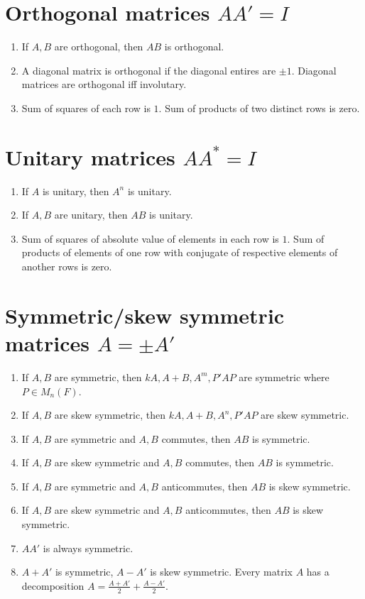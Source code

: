 \section{Orthogonal matrices $AA'=I$}
\begin{enumerate}
	\item If $A,B$ are orthogonal, then $AB$ is orthogonal.
	\item A diagonal matrix is orthogonal if the diagonal entires are $\pm 1$.
		\subitem Diagonal matrices are orthogonal iff involutary.
	\item Sum of squares of each row is $1$. Sum of products of two distinct rows is zero.
\end{enumerate}

\section{Unitary matrices $AA^\ast=I$}
\begin{enumerate}
	\item If $A$ is unitary, then $A^n$ is unitary.
	\item If $A,B$ are unitary, then $AB$ is unitary.
	\item Sum of squares of absolute value of elements in each row is $1$. Sum of products of elements of one row with conjugate of respective elements of another rows is zero.
\end{enumerate}

\section{Symmetric/skew symmetric matrices $A=\pm A'$}
\begin{enumerate}
	\item If $A,B$ are symmetric, then $kA,A+B,A^m,P'AP$ are symmetric where $P \in M_n(F)$.
	\item If $A,B$ are skew symmetric, then $kA,A+B,A^n,P'AP$ are skew symmetric.
	\item If $A,B$ are symmetric and $A,B$ commutes, then $AB$ is symmetric.
	\item If $A,B$ are skew symmetric and $A,B$ commutes, then $AB$ is symmetric.
	\item If $A,B$ are symmetric and $A,B$ anticommutes, then $AB$ is skew symmetric.
	\item If $A,B$ are skew symmetric and $A,B$ anticommutes, then $AB$ is skew symmetric.
	\item $AA'$ is always symmetric.
	\item $A+A'$ is symmetric, $A-A'$ is skew symmetric.
		\subitem Every matrix $A$ has a decomposition $A = \frac{A+A'}{2} + \frac{A-A'}{2}$.
\end{enumerate}

